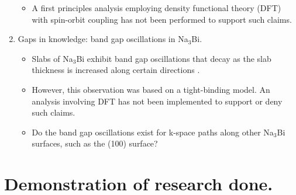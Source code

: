 \documentclass[english]{revtex4-1}
\begin{document}
\begin{enumerate}
\begin{itemize}
        \item A first principles analysis employing density functional theory (DFT) with spin-orbit coupling has not been performed to support such claims.

    \end{itemize}
   
     \item Gaps in knowledge: band gap oscillations in  Na$_3$Bi.
   
    \begin{itemize}
        
        \item Slabs of Na$_{3}$Bi exhibit band gap oscillations that decay as the slab thickness is increased along certain directions \cite{xiao_anisotropic_2015}. 
        
        \item However, this observation was based on a tight-binding model\cite{xiao_anisotropic_2015}. An analysis involving DFT has not been implemented to support or deny such claims.
        
        \item Do the band gap oscillations exist for k-space paths along other Na$_{3}$Bi surfaces, such as the (100) surface?
        
    \end{itemize}



\end{enumerate}


\section{Demonstration of research done.}
\end{document}
